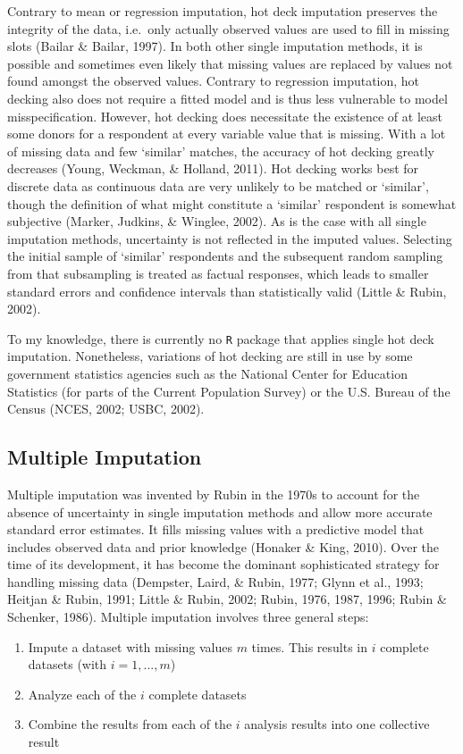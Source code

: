 \documentclass[12pt,econ]{sources/authesis}
\begin{document}
Contrary to mean or regression imputation, hot deck imputation preserves the integrity of the data, i.e.~only actually observed values are used to fill in missing slots (Bailar \& Bailar, 1997). In both other single imputation methods, it is possible and sometimes even likely that missing values are replaced by values not found amongst the observed values. Contrary to regression imputation, hot decking also does not require a fitted model and is thus less vulnerable to model misspecification. However, hot decking does necessitate the existence of at least some donors for a respondent at every variable value that is missing. With a lot of missing data and few `similar' matches, the accuracy of hot decking greatly decreases (Young, Weckman, \& Holland, 2011). Hot decking works best for discrete data as continuous data are very unlikely to be matched or `similar', though the definition of what might constitute a `similar' respondent is somewhat subjective (Marker, Judkins, \& Winglee, 2002). As is the case with all single imputation methods, uncertainty is not reflected in the imputed values. Selecting the initial sample of `similar' respondents and the subsequent random sampling from that subsampling is treated as factual responses, which leads to smaller standard errors and confidence intervals than statistically valid (Little \& Rubin, 2002).

To my knowledge, there is currently no \texttt{R} package that applies single hot deck imputation. Nonetheless, variations of hot decking are still in use by some government statistics agencies such as the National Center for Education Statistics (for parts of the Current Population Survey) or the U.S. Bureau of the Census (NCES, 2002; USBC, 2002).

\hypertarget{ordmiss-theory-multimpute}{%
\subsection{Multiple Imputation}\label{ordmiss-theory-multimpute}}

Multiple imputation was invented by Rubin in the 1970s to account for the absence of uncertainty in single imputation methods and allow more accurate standard error estimates. It fills missing values with a predictive model that includes observed data and prior knowledge (Honaker \& King, 2010). Over the time of its development, it has become the dominant sophisticated strategy for handling missing data (Dempster, Laird, \& Rubin, 1977; Glynn et al., 1993; Heitjan \& Rubin, 1991; Little \& Rubin, 2002; Rubin, 1976, 1987, 1996; Rubin \& Schenker, 1986). Multiple imputation involves three general steps:
\begin{enumerate}
\def\labelenumi{(\arabic{enumi})}
\item
  Impute a dataset with missing values \(m\) times. This results in \(i\) complete datasets (with \(i = 1, ..., m\))
\item
  Analyze each of the \(i\) complete datasets
\item
  Combine the results from each of the \(i\) analysis results into one collective result
\end{enumerate}
\vspace{0.8cm}
\end{document}
